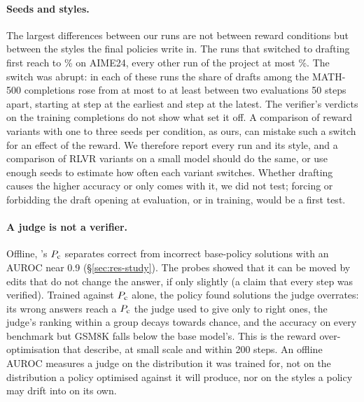 \paragraph{Seeds and styles.} The largest differences between our runs are not between reward conditions but between
the styles the final policies write in. The runs that switched to drafting first reach  to
\% on AIME24, every other run of the project at most \%. The switch was
abrupt: in each of these runs the share of drafts among the MATH-500 completions rose from at most
 to at least  between two evaluations 50 steps apart, starting at
step  at the earliest and step  at the latest. The verifier's verdicts
on the training completions do not show what set it off. A comparison of reward variants
with one to three seeds per condition, as ours, can mistake such a switch for an effect of the reward. We therefore
report every run and its style, and a comparison of RLVR variants on a small model should do the same, or use enough
seeds to estimate how often each variant switches. Whether drafting causes the higher accuracy or only comes with it,
we did not test; forcing or forbidding the draft opening at evaluation, or in training, would be a first test.

\paragraph{A judge is not a verifier.} Offline, \kev{}'s $P_{\mathrm{c}}$ separates correct from incorrect base-policy solutions
with an AUROC near 0.9 (\S\ref{sec:res-study}). The probes showed that it can be moved by edits that do not change the
answer, if only slightly (a claim that every step was verified). Trained against $P_{\mathrm{c}}$ alone, the policy found
solutions the judge overrates: its wrong answers reach a $P_{\mathrm{c}}$ the judge used to give only to right ones, the judge's
ranking within a group decays towards chance, and the accuracy on every benchmark but GSM8K falls below the base
model's. This is the reward over-optimisation that \citet{gao2023scaling} describe, at small scale and within 200
steps. An offline AUROC measures a judge on the distribution it was trained for, not on the distribution a policy
optimised against it will produce, nor on the styles a policy may drift into on its own.


